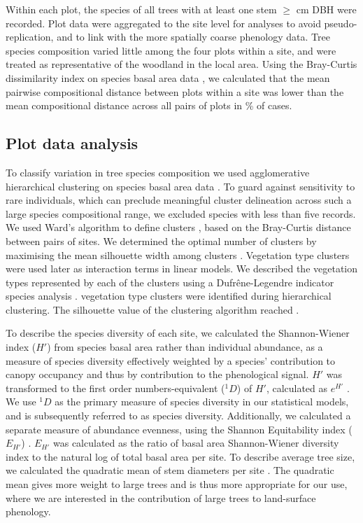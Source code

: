 \begin{refsection}
Within each plot, the species of all trees with at least one stem $\geq$\stemSize{} cm DBH were recorded. Plot data were aggregated to the site level for analyses to avoid pseudo-replication, and to link with the more spatially coarse phenology data. Tree species composition varied little among the four plots within a site, and were treated as representative of the woodland in the local area. Using the Bray-Curtis dissimilarity index on species basal area data \citep{Faith1987}, we calculated that the mean pairwise compositional distance between plots within a site was lower than the mean compositional distance across all pairs of plots in \plotDistPer{}\% of cases.

\subsection{Plot data analysis} 
\label{phen:ssec:plot_analysis}

To classify variation in tree species composition we used agglomerative hierarchical clustering on species basal area data \citep{Kreft2010, Fayolle2014}. To guard against sensitivity to rare individuals, which can preclude meaningful cluster delineation across such a large species compositional range, we excluded species with less than five records. We used Ward's algorithm to define clusters \citep{Murtagh2014}, based on the Bray-Curtis distance between pairs of sites. We determined the optimal number of clusters by maximising the mean silhouette width among clusters \citep{Rousseeuw1987}. Vegetation type clusters were used later as interaction terms in linear models. We described the vegetation types represented by each of the clusters using a Dufr\^{e}ne-Legendre indicator species analysis \citep{Dufrene1997}. \Numberstringnum{\nCluster} vegetation type clusters were identified during hierarchical clustering. The silhouette value of the clustering algorithm reached \silBest{}. 

To describe the species diversity of each site, we calculated the Shannon-Wiener index ($H'$) from species basal area rather than individual abundance, as a measure of species diversity effectively weighted by a species' contribution to canopy occupancy and thus by contribution to the phenological signal. $H'$ was transformed to the first order numbers-equivalent ($^1\!D$) of $H'$, calculated as $e^{H'}$ \citep{Jost2007}. We use $^1\!D$ as the primary measure of species diversity in our statistical models, and is subsequently referred to as species diversity. Additionally, we calculated a separate measure of abundance evenness, using the Shannon Equitability index ($E_{H'}$) \citep{Smith1996}. $E_{H'}$ was calculated as the ratio of basal area Shannon-Wiener diversity index to the natural log of total basal area per site. To describe average tree size, we calculated the quadratic mean of stem diameters per site \citep{Curtis2000}. The quadratic mean gives more weight to large trees and is thus more appropriate for our use, where we are interested in the contribution of large trees to land-surface phenology. 


\end{refsection}
